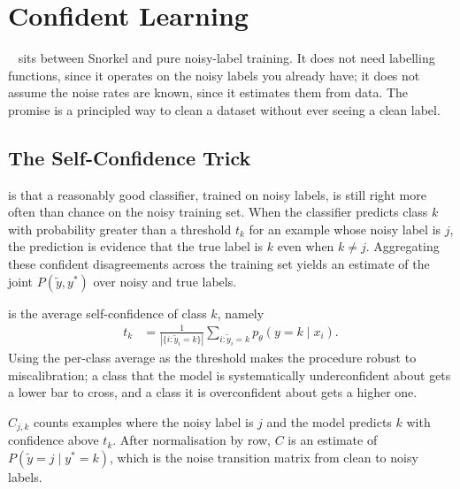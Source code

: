 \newpage
\section{Confident Learning}


~\cite{Northcutt2021ConfidentLearning} sits between Snorkel and pure noisy-label training. It does not need labelling functions, since it operates on the noisy labels you already have; it does not assume the noise rates are known, since it estimates them from data. The promise is a principled way to clean a dataset without ever seeing a clean label.

\subsection{The Self-Confidence Trick}

 is that a reasonably good classifier, trained on noisy labels, is still right more often than chance on the noisy training set. When the classifier predicts class $k$ with probability greater than a threshold $t_k$ for an example whose noisy label is $j$, the prediction is evidence that the true label is $k$ even when $k \neq j$. Aggregating these confident disagreements across the training set yields an estimate of the joint $P(\tilde y, y^*)$ over noisy and true labels.

 is the average self-confidence of class $k$, namely
\begin{align*}
    t_k &= \tfrac{1}{|\{i : \tilde y_i = k\}|} \sum_{i : \tilde y_i = k} p_\theta(y = k \mid x_i).
\end{align*}
Using the per-class average as the threshold makes the procedure robust to miscalibration; a class that the model is systematically underconfident about gets a lower bar to cross, and a class it is overconfident about gets a higher one.

 $C_{j, k}$ counts examples where the noisy label is $j$ and the model predicts $k$ with confidence above $t_k$. After normalisation by row, $C$ is an estimate of $P(\tilde y = j \mid y^* = k)$, which is the noise transition matrix from clean to noisy labels.

